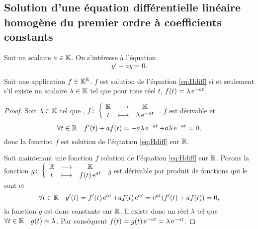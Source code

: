 \subsection[Solution équation homogène coefficients constants]{Solution d'une équation différentielle linéaire homogène du premier ordre à coefficients constants}
\label{subsec:solutioneqdifflinhomog1coefconstants}
Soit un scalaire \(a \in \mathbb{K}\). On s'intéresse à l'équation 
\begin{equation}
\label{eq:Hdiff}
y'+ay=0.
\end{equation}
%
\begin{theo}
\label{theo:1}
Soit une application \(f \in \mathbb{K}^{\mathbb{R}}\). \(f\) est solution de l'équation \eqref{eq:Hdiff} si et seulement s'il existe un scalaire \(\lambda \in \mathbb{K}\) tel que pour tous réel \(t\), \(f(t)=\lambda \operatorname{e}^{-at}\).
\end{theo}
\begin{proof}
Soit \(\lambda \in \mathbb{K}\) tel que , \(f\colon \left\{\begin{array}{ccc} \mathbb{R} & \longrightarrow &\mathbb{K}\\ t & \longmapsto & \lambda \operatorname{e}^{-at} \end{array} \right.\). \(f\) est dérivable et
\begin{equation}
\forall t \in \mathbb{R} \quad f'(t)+af(t)=-a \lambda \operatorname{e}^{-at}+a \lambda \operatorname{e}^{-at}=0,
\end{equation}
donc la fonction \(f\) est solution de l'équation \eqref{eq:Hdiff} sur \(\mathbb{R}\). 

Soit maintenant une fonction \(f\) solution de l'équation \eqref{eq:Hdiff} sur \(\mathbb{R}\). Posons la fonction \(g\colon \left\{\begin{array}{ccc} \mathbb{R} & \longrightarrow &\mathbb{K}\\ t & \longmapsto & f(t)\operatorname{e}^{at} \end{array} \right.\) \(g\) est dérivable par produit de fonctions qui le sont et
\begin{equation}
\forall t \in \mathbb{R} \quad g'(t)=f'(t)\operatorname{e}^{at} + af(t)\operatorname{e}^{at}=\operatorname{e}^{at}(f'(t)+af(t))=0,
\end{equation}
la fonction \(g\) est donc constante sur \(\mathbb{R}\). Il existe donc un réel \(\lambda\) tel que \(\forall t \in \mathbb{R} \quad g(t)=\lambda\). Par conséquent \(f(t)=g(t)\operatorname{e}^{-at}=\lambda \operatorname{e}^{-at}\).
\end{proof}

